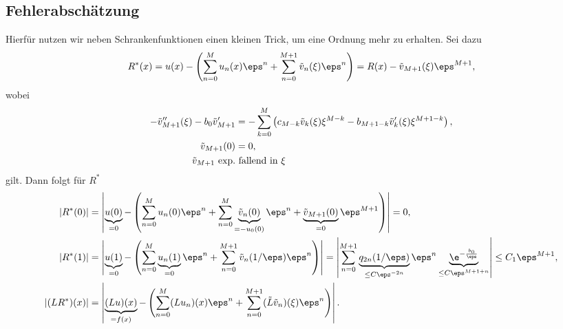 \documentclass[12pt]{article}
\begin{document}
  \subsection*{Fehlerabschätzung}
  Hierfür nutzen wir neben Schrankenfunktionen einen kleinen Trick, um eine Ordnung mehr zu erhalten. Sei dazu
  \[
      R^*(x)
         =u(x)-\left( \sum_{n=0}^Mu_n(x)\eps^n+\sum_{n=0}^{M+1}\tilde v_n(\xi)\eps^n\right) 
         = R(x)-\tilde v_{M+1}(\xi)\eps^{M+1},
  \] 
  wobei
  \begin{align}
      -\tilde v''_{M+1}(\xi)-b_0\tilde v'_{M+1}
        &=-\sum\limits_{k=0}^{M}\left( c_{M-k}\tilde v_k(\xi)\xi^{M-k}-b_{M+1-k}\tilde v_k'(\xi)\xi^{M+1-k}\right) ,\label{eq:vm1}\\
            \tilde v_{M+1}(0)&=0,\notag\\
            \tilde v_{M+1} \mbox{ exp.}&\mbox{ fallend in $\xi$}\notag
  \end{align}
  gilt. Dann folgt für $R^*$
  \begin{align*}
      |R^*(0)| &= \left|
                  \underbrace{u(0)}_{=0}
                  -\left( \sum_{n=0}^Mu_n(0)\eps^n
                         +\sum_{n=0}^M\underbrace{\tilde v_n(0)}_{=-u_0(0)}\eps^n
                         +\underbrace{\tilde v_{M+1}(0)}_{=0}\eps^{M+1}
                   \right)
                \right|=0,\\
      |R^*(1)| &= \left|
                  \underbrace{u(1)}_{=0}
                  -\left( \sum_{n=0}^M\underbrace{u_n(1)}_{=0}\eps^n
                         +\sum_{n=0}^{M+1}\tilde v_n(1/\eps)\eps^n
                   \right)
                \right|
               =\left|
                    \sum_{n=0}^{M+1}\underbrace{q_{2n}(1/\eps)}_{\leq C\eps^{-2n}}\eps^n\underbrace{\e^{-\frac{b_0}{\eps}}}_{\leq C\eps^{M+1+n}}
                \right|
              \leq C_1\eps^{M+1},\\
      |(LR^*)(x)| &= \left|
                     \underbrace{(Lu)(x)}_{=f(x)}
                     -\left( \sum_{n=0}^M(Lu_n)(x)\eps^n
                            +\sum_{n=0}^{M+1}(\tilde L\tilde v_n)(\xi)\eps^n
                      \right)
                   \right|.
  \end{align*}
\end{document}
